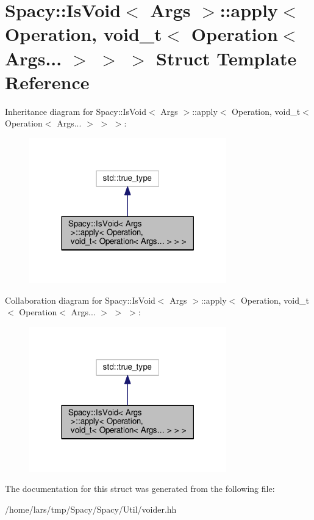 \hypertarget{structSpacy_1_1IsVoid_1_1apply_3_01Operation_00_01void__t_3_01Operation_3_01Args_8_8_8_01_4_01_4_01_4}{}\section{Spacy\+:\+:Is\+Void$<$ Args $>$\+:\+:apply$<$ Operation, void\+\_\+t$<$ Operation$<$ Args... $>$ $>$ $>$ Struct Template Reference}
\label{structSpacy_1_1IsVoid_1_1apply_3_01Operation_00_01void__t_3_01Operation_3_01Args_8_8_8_01_4_01_4_01_4}


Inheritance diagram for Spacy\+:\+:Is\+Void$<$ Args $>$\+:\+:apply$<$ Operation, void\+\_\+t$<$ Operation$<$ Args... $>$ $>$ $>$\+:
\nopagebreak
\begin{figure}[H]
\begin{center}
\leavevmode
\includegraphics[width=242pt]{structSpacy_1_1IsVoid_1_1apply_3_01Operation_00_01void__t_3_01Operation_3_01Args_8_8_8_01_4_01_4_01_4__inherit__graph}
\end{center}
\end{figure}


Collaboration diagram for Spacy\+:\+:Is\+Void$<$ Args $>$\+:\+:apply$<$ Operation, void\+\_\+t$<$ Operation$<$ Args... $>$ $>$ $>$\+:
\nopagebreak
\begin{figure}[H]
\begin{center}
\leavevmode
\includegraphics[width=242pt]{structSpacy_1_1IsVoid_1_1apply_3_01Operation_00_01void__t_3_01Operation_3_01Args_8_8_8_01_4_01_4_01_4__coll__graph}
\end{center}
\end{figure}


The documentation for this struct was generated from the following file\+:\begin{DoxyCompactItemize}
\item 
/home/lars/tmp/\+Spacy/\+Spacy/\+Util/voider.\+hh\end{DoxyCompactItemize}
